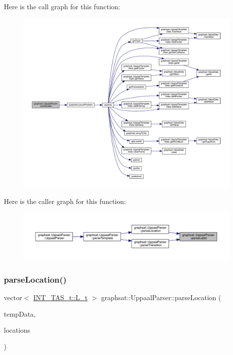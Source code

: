 Here is the call graph for this function\+:
\nopagebreak
\begin{figure}[H]
\begin{center}
\leavevmode
\includegraphics[width=350pt]{classgraphsat_1_1_uppaal_parser_a33d35bb79055b36cf00b281a63265a41_cgraph}
\end{center}
\end{figure}
Here is the caller graph for this function\+:
\nopagebreak
\begin{figure}[H]
\begin{center}
\leavevmode
\includegraphics[width=350pt]{classgraphsat_1_1_uppaal_parser_a33d35bb79055b36cf00b281a63265a41_icgraph}
\end{center}
\end{figure}
\mbox{\label{classgraphsat_1_1_uppaal_parser_a7d6c4e8f548cf5abe26ea192eaf4a0e2}} 
\subsubsection{\texorpdfstring{parseLocation()}{parseLocation()}}
{\footnotesize\ttfamily vector$<$ \mbox{\hyperlink{classgraphsat_1_1_t_a_s_a34bf8786372c42fbf45e9d3274a5e325}{I\+N\+T\+\_\+\+T\+A\+S\+\_\+t\+::\+L\+\_\+t}} $>$ graphsat\+::\+Uppaal\+Parser\+::parse\+Location (\begin{DoxyParamCaption}\item[{\mbox{\hyperlink{classgraphsat_1_1_uppaal_template_data}{Uppaal\+Template\+Data}} \&}]{temp\+Data,  }\item[{\mbox{\hyperlink{namespacegraphsat_aba2f5cf076d49898cc0469bee94d3a05}{child\+\_\+type}}}]{locations }\end{DoxyParamCaption})\hspace{0.3cm}{\ttfamily [private]}}

